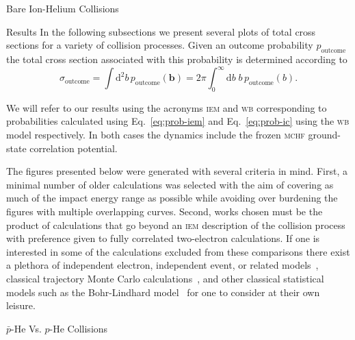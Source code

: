 \documentclass[letterpaper, 11 pt]{report}
\begin{document}
\begin{chapter}{Bare Ion-Helium Collisions \label{chap:p-he2p-he}}
\begin{section}{Results \label{sec:phe2p-res}}
      In the following subsections we present several plots of total cross sections for a variety of
      collision processes. Given an outcome probability $p_\mathrm{outcome}$ the total cross section
      associated with this probability is determined according to
      \begin{equation} \label{eq:tcs}
         \sigma_\mathrm{outcome} = \int \mathrm{d}^2 b \, p_\mathrm{outcome} (\mathbf{b})
         = 2 \pi \int^\infty_0 \mathrm{d}b \; b \, p_\mathrm{outcome} (b).
      \end{equation}

      We will refer to our results using the acronyms \textsc{iem} and \textsc{wb} corresponding to
      probabilities calculated using Eq.~\eqref{eq:prob-iem} and Eq.~\eqref{eq:prob-ic} using the
      \textsc{wb} model respectively. In both cases the dynamics include the frozen \textsc{mchf}
      ground-state correlation potential.

      The figures presented below were generated with several criteria in mind. First, a minimal number
      of older calculations was selected with the aim of covering as much of the impact energy range as
      possible while avoiding over burdening the figures with multiple overlapping curves. Second, works
      chosen must be the product of calculations that go beyond an \textsc{iem} description of the
      collision process with preference given to fully correlated two-electron calculations. If one is
      interested in some of the calculations excluded from these comparisons there exist a plethora of
      independent electron, independent event, or related models~\cite{SLD-83, DMR-84, SLD-85, GM-86,
      CM-87, GM-87, JLF-89, DC-90, DC-91a, DC-91b, DG-91, SKG-91, SL-91, Kuang-92, MLC-93, CM-94,
      CSR-95, BDM-96, MBGH-97, McCartney-97, McCartney-99, GAMRF-02, GFS-02, AMRF-04, BLMC-04, FRBJG-06,
      FJG-07, GIFK-08, ZK-09, G-11, LFG-11, GG-12a}, classical trajectory Monte Carlo
      calculations~\cite{ZM-85, OWM-86, MO-87, WO-88, MS-89, Cohen-96, TH-96, MMTH-02, DAKW-04, GEP-09},
      and other classical statistical models such as the Bohr-Lindhard model~\cite{DYC-08,Ding-12} for
      one to consider at their own leisure.

      \begin{subsection}{ \texorpdfstring{$\bar{p}$}{pbar}-He Vs. \texorpdfstring{$p$}{p}-He Collisions
                         \label{sec:pbarhe-res}}


\end{subsection}
\end{section}
\end{chapter}
\end{document}
